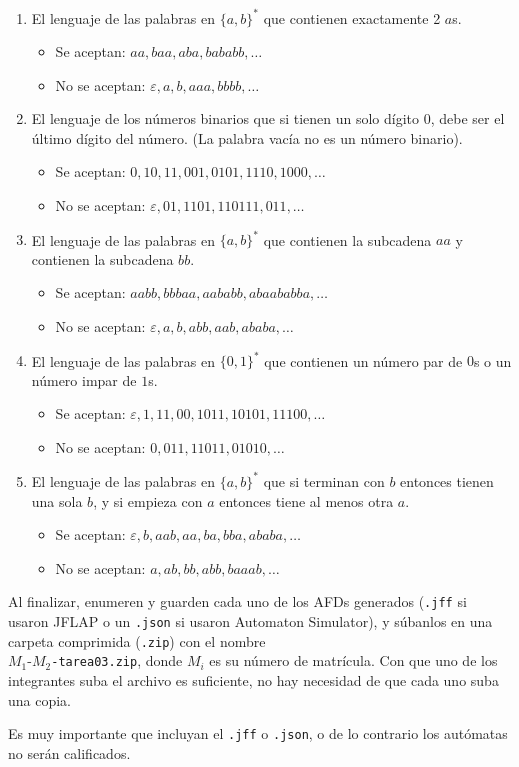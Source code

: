 \documentclass[]{book}
\theoremstyle{definition}
\begin{document}
\begin{enumerate}
	\itemsep3.5ex
	\item El lenguaje de las palabras en $\{a,b\}^*$ que contienen exactamente 2 $a$s.
	\begin{itemize}
		\item Se aceptan: $aa, baa, aba, bababb, \dots$
		\item No se aceptan: $\varepsilon , a, b, aaa, bbbb, \dots$
	\end{itemize}
	
	\item El lenguaje de los números binarios que si tienen un solo dígito $0$, debe ser el último dígito del número. (La palabra vacía no es un número binario).
	\begin{itemize}
		\item Se aceptan: $0, 10, 11, 001, 0101, 1110, 1000, \dots$
		\item No se aceptan: $\varepsilon , 01, 1101, 110111, 011, \dots$
	\end{itemize}

	\item El lenguaje de las palabras en $\{a, b\}^*$ que contienen la subcadena $aa$ y contienen la subcadena $bb$.
	\begin{itemize}
		\item Se aceptan: $aabb, bbbaa, aababb, abaababba, \dots$
		\item No se aceptan: $\varepsilon , a, b, abb, aab, ababa, \dots$
	\end{itemize}

	\item El lenguaje de las palabras en $\{0,1 \}^*$ que contienen un número par de $0$s o un número impar de $1$s.
	\begin{itemize}
		\item Se aceptan: $\varepsilon , 1, 11, 00, 1011, 10101, 11100, \dots$
		\item No se aceptan: $0, 011, 11011, 01010, \dots$
	\end{itemize}

	\item El lenguaje de las palabras en $\{a, b\}^*$ que si terminan con $b$ entonces tienen una sola $b$, y si empieza con $a$ entonces tiene al menos otra $a$.
	\begin{itemize}
		\item Se aceptan: $\varepsilon , b, aab, aa, ba, bba, ababa, \dots$
		\item No se aceptan: $a, ab, bb, abb, baaab, \dots$
	\end{itemize}
\end{enumerate}

Al finalizar, enumeren y guarden cada uno de los AFDs generados (\texttt{.jff} si usaron JFLAP o un \texttt{.json} si usaron Automaton Simulator), y súbanlos en una carpeta comprimida (\texttt{.zip}) con el nombre\\$M_1$-$M_2$\texttt{-tarea03.zip}, donde $M_i$ es su número de matrícula.
Con que uno de los integrantes suba el archivo es suficiente, no hay necesidad de que cada uno suba una copia.

Es muy importante que incluyan el \texttt{.jff} o \texttt{.json}, o de lo contrario los autómatas no serán calificados.
\end{document}
